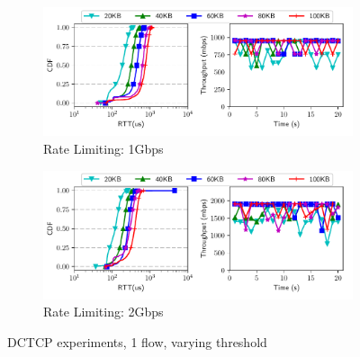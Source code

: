 \begin{figure}[!htb]
\centering

\begin{subfigure}[b]{0.45\textwidth}
\centering
\includegraphics[width=\textwidth]{rate_limiter/raw_data/dctcp_benchmark/1gbps.pdf}
\caption{Rate Limiting: 1Gbps}
\label{fig:dctcp-1g} 
\end{subfigure}
\begin{subfigure}[b]{0.45\textwidth}
\centering
\includegraphics[width=\textwidth]{rate_limiter/raw_data/dctcp_benchmark/2gbps.pdf}
\caption{Rate Limiting: 2Gbps}
\label{fig:dctcp-2g} 
\end{subfigure}
\caption{DCTCP experiments, 1 flow, varying threshold}
\label{fig:dctcp}
\end{figure}


